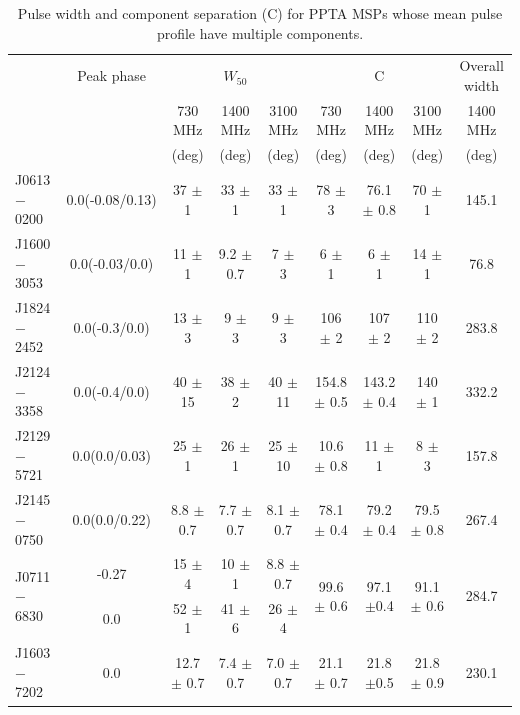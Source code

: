\documentclass[useAMS,usenatbib]{mn2e}
\begin{document}
\begin{table}
\begin{center}
\caption{Pulse width and component separation (C) for PPTA MSPs whose mean pulse 
profile have multiple components.}
\label{tableWidth2}
\begin{tabular}{lcccccccc}
\hline
                 & Peak phase  &         & $W_{50}$ &          &         &    C     &          &  Overall width   \\
								 &             & 730 MHz & 1400 MHz & 3100 MHz & 730 MHz & 1400 MHz & 3100 MHz &  1400 MHz        \\
								 &             & (deg)   & (deg)    &  (deg)   &  (deg)  & (deg)    &   (deg)  &   (deg)          \\
\hline
J0613$-$0200     &  0.0(-0.08/0.13) &  37 $\pm$ 1    & 33 $\pm$ 1    & 33 $\pm$ 1    &   78 $\pm$ 3    & 76.1 $\pm$ 0.8 &  70 $\pm$ 1   &  145.1   \\
J1600$-$3053     &  0.0(-0.03/0.0)  &  11 $\pm$ 1    &9.2 $\pm$ 0.7  &  7 $\pm$ 3    &    6 $\pm$ 1    &    6 $\pm$ 1   &  14 $\pm$ 1   &  76.8    \\
J1824$-$2452     &  0.0(-0.3/0.0)   &  13 $\pm$ 3    &  9 $\pm$ 3    &  9 $\pm$ 3    &  106 $\pm$ 2    &  107 $\pm$ 2   & 110 $\pm$ 2   &  283.8   \\
J2124$-$3358     &  0.0(-0.4/0.0)   &  40 $\pm$ 15   & 38 $\pm$ 2    & 40 $\pm$ 11   &154.8 $\pm$ 0.5  &143.2 $\pm$ 0.4 & 140 $\pm$ 1   &  332.2   \\
J2129$-$5721     &  0.0(0.0/0.03)   &  25 $\pm$ 1    & 26 $\pm$ 1    & 25 $\pm$ 10   & 10.6 $\pm$ 0.8  &   11 $\pm$ 1   &   8 $\pm$ 3   &  157.8   \\
J2145$-$0750     &  0.0(0.0/0.22)   & 8.8 $\pm$ 0.7  &7.7 $\pm$ 0.7  &8.1 $\pm$ 0.7  & 78.1 $\pm$ 0.4  & 79.2 $\pm$ 0.4 &79.5 $\pm$ 0.8 &  267.4   \\ 
\hline
\hline
\multirow{2}{*}{J0711$-$6830} & -0.27 &  15 $\pm$ 4     &   10 $\pm$ 1     &8.8 $\pm$ 0.7   & \multirow{2}{*}{99.6 $\pm$ 0.6} & \multirow{2}{*}{97.1  $\pm $0.4 }& \multirow{2}{*}{91.1 $\pm$ 0.6}   &  \multirow{2}{*}{284.7}  \\
                              & 0.0   &  52 $\pm$ 1     &   41 $\pm$ 6     & 26 $\pm$ 4     &                                 &                                  &                                   &                          \\ 
\multirow{2}{*}{J1603$-$7202} & 0.0   &12.7 $\pm$ 0.7   &  7.4 $\pm$ 0.7   &7.0 $\pm$ 0.7   & \multirow{2}{*}{21.1 $\pm$ 0.7} & \multirow{2}{*}{21.8  $\pm $0.5 }& \multirow{2}{*}{21.8 $\pm$ 0.9}   &  \multirow{2}{*}{230.1}  \\

\end{tabular}
\end{center}
\end{table}
\end{document}
